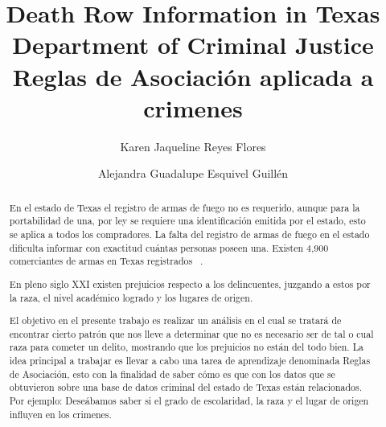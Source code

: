 \documentclass[sigconf]{acmart}
\begin{document}
\title{Death Row Information in Texas Department of Criminal Justice \\ Reglas de Asociación aplicada a crimenes}
\author{Karen Jaqueline Reyes Flores}

\author{Alejandra Guadalupe Esquivel Guillén}
\renewcommand{\shortauthors}{MINERIA DE DATOS}
\renewcommand{\abstractname}{Resumen}
\begin{abstract}
En el estado de Texas el registro de armas de fuego no es requerido, aunque para la portabilidad de una, por ley se requiere una identificación emitida por el estado, esto se aplica a todos los compradores. La falta del registro de armas de fuego en el estado dificulta informar con exactitud cuántas personas poseen una. Existen 4,900 comerciantes de armas en Texas registrados ~\cite{infoArmas}.

En pleno siglo XXI existen prejuicios respecto a los delincuentes, juzgando a estos por la raza, el nivel académico logrado y los lugares de origen.

El objetivo en el presente trabajo es realizar un análisis en el cual se tratará de encontrar cierto patrón que nos lleve a determinar que no es necesario ser de tal o cual raza para cometer un delito, mostrando que los prejuicios no están del todo bien.
La idea principal a trabajar es llevar a cabo una tarea de aprendizaje denominada Reglas de Asociación, esto con la finalidad de saber cómo es que con los datos que se obtuvieron sobre una base de datos criminal del estado de Texas están relacionados.
\\Por ejemplo: Deseábamos saber si el grado de escolaridad, la raza y el lugar de origen influyen en los crimenes.

\end{abstract}

\end{document}
